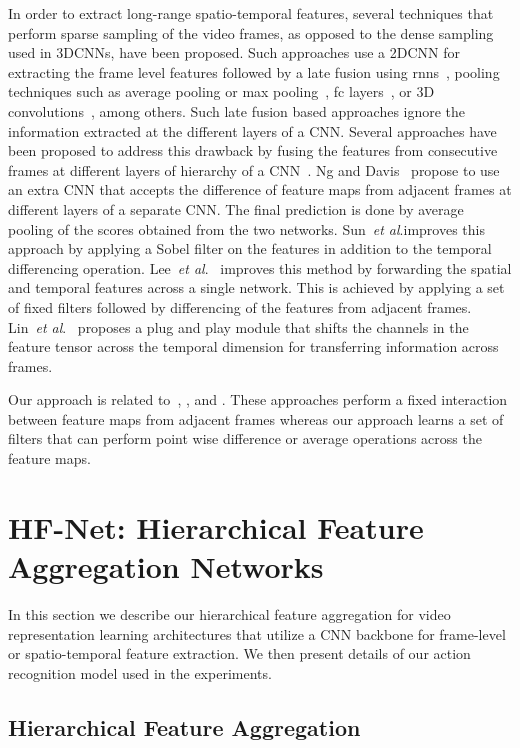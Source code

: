 \documentclass[journal,onecolumn]{IEEEtran}
\def\etal{\emph{et al}.}
\begin{document}
In order to extract long-range spatio-temporal features, several techniques that perform sparse sampling of the video frames, as opposed to the dense sampling used in 3DCNNs, have been proposed. Such approaches use a 2DCNN for extracting the frame level features followed by a late fusion using \acp{rnn}~\cite{yue2015beyond, lrcn}, pooling techniques such as average pooling or max pooling~\cite{tsn}, \ac{fc} layers~\cite{trn}, or 3D convolutions~\cite{eco}, among others. Such late fusion based approaches ignore the information extracted at the different layers of a CNN. Several approaches have been proposed to address this drawback by fusing the features from consecutive frames at different layers of hierarchy of a CNN~\cite{tdn, off, lee2018motion}. Ng and Davis~\cite{tdn} propose to use an extra CNN that accepts the difference of feature maps from adjacent frames at different layers of a separate CNN. The final prediction is done by average pooling of the scores obtained from the two networks. Sun~\etal improves this approach by applying a Sobel filter on the features in addition to the temporal differencing operation. Lee~\etal~\cite{lee2018motion} improves this method by forwarding the spatial and temporal features across a single network. This is achieved by applying a set of fixed filters followed by differencing of the features from adjacent frames.
Lin~\etal~\cite{tsm} proposes a plug and play module that shifts the channels in the feature tensor across the temporal dimension for transferring information across frames.

Our approach is related to~\cite{tdn}, \cite{off}, \cite{lee2018motion} and \cite{tsm}. These approaches perform a fixed interaction between feature maps from adjacent frames whereas our approach learns a set of filters that can perform point wise difference or average operations across the feature maps.


\section{HF-Net: Hierarchical Feature Aggregation Networks}
\label{sec:hfnet_main}
In this section we describe our hierarchical feature aggregation for video representation learning architectures that utilize a CNN backbone for frame-level or spatio-temporal feature extraction. We then present details of our action recognition model used in the experiments.

\subsection{Hierarchical Feature Aggregation}
\label{sec:hfmodule}
\end{document}

